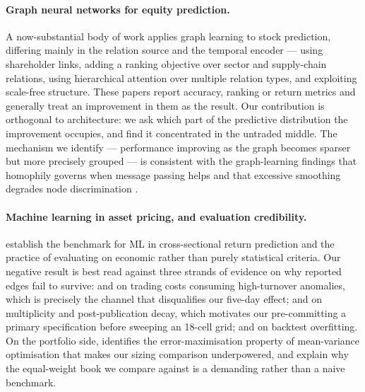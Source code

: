 \documentclass[11pt]{airesearch}
\begin{document}
\paragraph{Graph neural networks for equity prediction.} A now-substantial
body of work applies graph learning to stock prediction, differing mainly in
the relation source and the temporal encoder ---
\citet{chen2018incorporating} using shareholder links,
\citet{feng2019temporal} adding a ranking objective over sector and
supply-chain relations, \citet{kim2019hats} using hierarchical attention over
multiple relation types, and \citet{sawhney2021exploring} exploiting
scale-free structure. These papers report accuracy, ranking or return metrics
and generally treat an improvement in them as the result. Our contribution is
orthogonal to architecture: we ask which part of the predictive distribution
the improvement occupies, and find it concentrated in the untraded middle. The
mechanism we identify --- performance improving as the graph becomes sparser
but more precisely grouped --- is consistent with the graph-learning findings
that homophily governs when message passing helps
\citep{zhu2020beyond} and that excessive smoothing degrades node
discrimination \citep{li2018deeper}.

\paragraph{Machine learning in asset pricing, and evaluation credibility.}
\citet{gu2020empirical} establish the benchmark for ML in cross-sectional
return prediction and the practice of evaluating on economic rather than
purely statistical criteria. Our negative result is best read against three
strands of evidence on why reported edges fail to survive:
\citet{novymarx2016taxonomy} and \citet{korajczyk2004momentum} on trading
costs consuming high-turnover anomalies, which is precisely the channel that
disqualifies our five-day effect; \citet{harvey2016cross} and
\citet{mclean2016does} on multiplicity and post-publication decay, which
motivates our pre-committing a primary specification before sweeping an
18-cell grid; and \citet{bailey2014pseudo} on backtest overfitting. On the
portfolio side, \citet{michaud1989markowitz} identifies the error-maximisation
property of mean-variance optimisation \citep{markowitz1952portfolio} that
makes our sizing comparison underpowered, and \citet{demiguel2009optimal}
explain why the equal-weight book we compare against is a demanding rather
than a naive benchmark.
\end{document}
